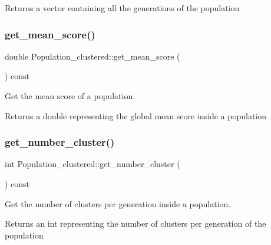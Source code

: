 \begin{DoxyReturn}{Returns}
a vector containing all the generations of the population 
\end{DoxyReturn}
\mbox{\label{class_population__clustered_a09317877b808df0255f429ba10eacfc9}} 
\subsubsection{\texorpdfstring{get\+\_\+mean\+\_\+score()}{get\_mean\_score()}}
{\footnotesize\ttfamily double Population\+\_\+clustered\+::get\+\_\+mean\+\_\+score (\begin{DoxyParamCaption}{ }\end{DoxyParamCaption}) const}



Get the mean score of a population. 

\begin{DoxyReturn}{Returns}
a double representing the global mean score inside a population 
\end{DoxyReturn}
\mbox{\label{class_population__clustered_a04e1cd70504458ab365c756931c1670b}} 
\subsubsection{\texorpdfstring{get\+\_\+number\+\_\+cluster()}{get\_number\_cluster()}}
{\footnotesize\ttfamily int Population\+\_\+clustered\+::get\+\_\+number\+\_\+cluster (\begin{DoxyParamCaption}{ }\end{DoxyParamCaption}) const}



Get the number of clusters per generation inside a population. 

\begin{DoxyReturn}{Returns}
an int representing the number of clusters per generation of the population 
\end{DoxyReturn}
\mbox{\label{class_population__clustered_ae9776425b15b2588d1098de48927925b}} 
